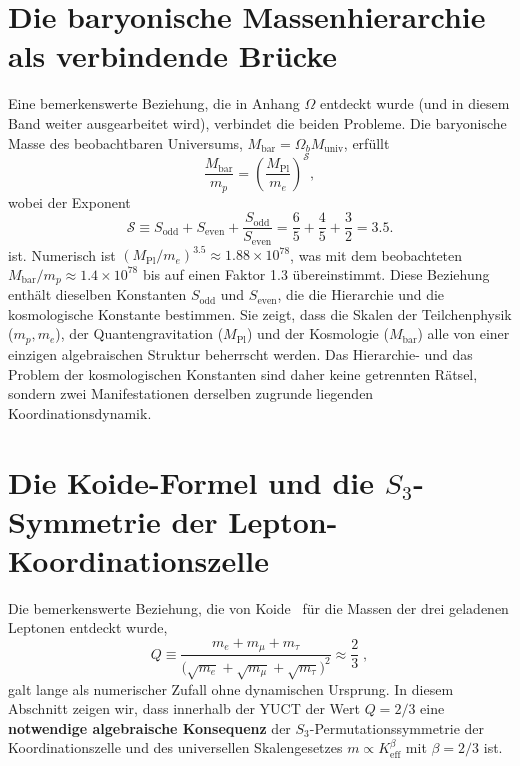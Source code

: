 \documentclass[11pt,a4paper]{article}
\theoremstyle{remark}
\begin{document}
	\section{Die baryonische Massenhierarchie als verbindende Brücke}
	
	Eine bemerkenswerte Beziehung, die in Anhang $\Omega$ entdeckt wurde (und in diesem Band weiter ausgearbeitet wird), verbindet die beiden Probleme. Die baryonische Masse des beobachtbaren Universums, \(M_{\mathrm{bar}} = \Omega_b M_{\mathrm{univ}}\), erfüllt
	\begin{equation}
		\frac{M_{\mathrm{bar}}}{m_p} = \left( \frac{M_{\mathrm{Pl}}}{m_e} \right)^{\mathcal{S}},
		\label{eq:baryon-hierarchy}
	\end{equation}
	wobei der Exponent
	\begin{equation}
		\mathcal{S} \equiv S_{\mathrm{odd}} + S_{\mathrm{even}} + \frac{S_{\mathrm{odd}}}{S_{\mathrm{even}}} = \frac{6}{5} + \frac{4}{5} + \frac{3}{2} = 3.5.
	\end{equation}
	ist. Numerisch ist \((M_{\mathrm{Pl}}/m_e)^{3.5} \approx 1.88 \times 10^{78}\), was mit dem beobachteten \(M_{\mathrm{bar}}/m_p \approx 1.4 \times 10^{78}\) bis auf einen Faktor 1.3 übereinstimmt. Diese Beziehung enthält dieselben Konstanten \(S_{\mathrm{odd}}\) und \(S_{\mathrm{even}}\), die die Hierarchie und die kosmologische Konstante bestimmen. Sie zeigt, dass die Skalen der Teilchenphysik (\(m_p, m_e\)), der Quantengravitation (\(M_{\mathrm{Pl}}\)) und der Kosmologie (\(M_{\mathrm{bar}}\)) alle von einer einzigen algebraischen Struktur beherrscht werden. Das Hierarchie- und das Problem der kosmologischen Konstanten sind daher keine getrennten Rätsel, sondern zwei Manifestationen derselben zugrunde liegenden Koordinationsdynamik.
	
	\section{Die Koide-Formel und die \(S_3\)-Symmetrie der Lepton-Koordinationszelle}
	\label{sec:koide}
	
	Die bemerkenswerte Beziehung, die von Koide~\cite{Koide1983} für die Massen der drei geladenen Leptonen entdeckt wurde,
	\begin{equation}
		Q \equiv \frac{m_e + m_\mu + m_\tau}{\bigl(\sqrt{m_e} + \sqrt{m_\mu} + \sqrt{m_\tau}\bigr)^2}
		\approx \frac{2}{3}\;,
	\end{equation}
	galt lange als numerischer Zufall ohne dynamischen Ursprung. In diesem Abschnitt zeigen wir, dass innerhalb der YUCT der Wert \(Q=2/3\) eine \textbf{notwendige algebraische Konsequenz} der \(S_3\)-Permutationssymmetrie der Koordinationszelle und des universellen Skalengesetzes \(m \propto K_{\mathrm{eff}}^{\beta}\) mit \(\beta=2/3\) ist.
	
\end{document}

